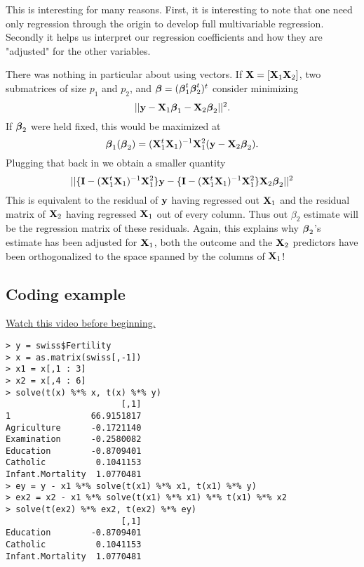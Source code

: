This is interesting for many reasons. First, it
is interesting to note that one need only 
regression through the origin to develop full
multivariable regression. Secondly it helps
us interpret our regression coefficients and
how they are "adjusted" for the other variables.

There was nothing in particular about using vectors.
If $\mathbf{X} = [\mathbf{X}_1 \mathbf{X}_2]$, two submatrices of size
$p_1$ and $p_2$, and $\boldsymbol{\beta} = (\boldsymbol{\beta}_1^t \boldsymbol{\beta}_2^t)^t$ consider minimizing  
$$
|| \mathbf{y} - \mathbf{X}_1 \boldsymbol{\beta}_1 - \mathbf{X}_2 \boldsymbol{\beta}_2||^2.
$$
If $\boldsymbol{\beta}_2$ were held fixed, this would be maximized
at 
$$
\boldsymbol{\beta}_1(\boldsymbol{\beta}_2) = 
(\mathbf{X}_1^t \mathbf{X}_1)^{-1} \mathbf{X}_1^2 (\mathbf{y} - \mathbf{X}_2 \boldsymbol{\beta}_2).
$$
Plugging that back in we obtain a smaller quantity
$$
||\{\mathbf{I} - (\mathbf{X}_1^t \mathbf{X}_1)^{-1} \mathbf{X}_1^2\} \mathbf{y}
- \{\mathbf{I} - (\mathbf{X}_1^t \mathbf{X}_1)^{-1} \mathbf{X}_1^2 \}\mathbf{X}_2 \boldsymbol{\beta}_2
||^2
$$
This is equivalent to the residual of $\mathbf{y}$ having
regressed out $\mathbf{X}_1$ and the residual matrix of
$\mathbf{X}_2$ having regressed $\mathbf{X}_1$ out of every column.
Thus out $\beta_2$ estimate will be the regression
matrix of these residuals. Again, this explains
why $\boldsymbol{\beta}_2$'s estimate has been adjusted for
$\mathbf{X}_1$, both the outcome and the $\mathbf{X}_2$ predictors
have been orthogonalized to the space spanned
by the columns of $\mathbf{X}_1$!


\subsection{Coding example}

\href{https://www.youtube.com/watch?v=qRfydAddY7M&list=PLpl-gQkQivXhdgUCdaUQcdb31CRe8Mm2y&index=27}{Watch this video before beginning.}

\begin{verbatim}
> y = swiss$Fertility
> x = as.matrix(swiss[,-1])
> x1 = x[,1 : 3]
> x2 = x[,4 : 6]
> solve(t(x) %*% x, t(x) %*% y)
                       [,1]
1                66.9151817
Agriculture      -0.1721140
Examination      -0.2580082
Education        -0.8709401
Catholic          0.1041153
Infant.Mortality  1.0770481
> ey = y - x1 %*% solve(t(x1) %*% x1, t(x1) %*% y)
> ex2 = x2 - x1 %*% solve(t(x1) %*% x1) %*% t(x1) %*% x2
> solve(t(ex2) %*% ex2, t(ex2) %*% ey)
                       [,1]
Education        -0.8709401
Catholic          0.1041153
Infant.Mortality  1.0770481
\end{verbatim}










